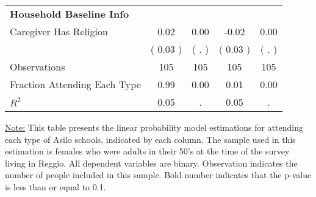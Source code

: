 \begin{table}[H]
{\begin{tabular}{lcccc}
\midrule
\textbf{Household Baseline Info} \\
\quad Caregiver Has Religion &      0.02 &      0.00 &     -0.02 &      0.00 \\
\quad  & (     0.03 ) & (        . )  & (     0.03 )  & (        . )  \\
\midrule
Observations & 105 & 105 & 105 & 105 \\
Fraction Attending Each Type &      0.99 &      0.00 &      0.01 &      0.00 \\
\midrule
$ R^2$ &      0.05 &         . &      0.05 &         . \\
\bottomrule
\end{tabular}}
\end{table}
\begin{footnotesize}
\noindent\underline{Note:} This table presents the linear probability model estimations for attending each type of Asilo schools, indicated by each column. The sample used in this estimation is females who were adults in their 50's at the time of the survey living in Reggio. All dependent variables are binary. Observation indicates the number of people included in this sample. Bold number indicates that the p-value is less than or equal to 0.1.
\end{footnotesize}
